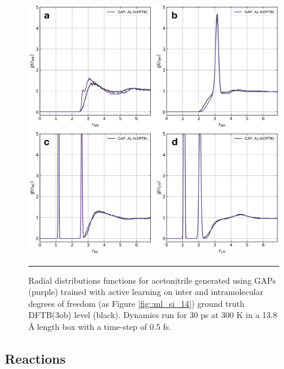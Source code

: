 \documentclass[../../main.tex]{subfiles}
\begin{document}
\begin{figure}[h!]
	\vspace{0.4cm}
	\centering
    \includegraphics[width=14cm]{6/gap/figs_si/fig15}
	\vspace{0.2cm}
	\hrule
	\caption{Radial distributions functions for acetonitrile generated using GAPs (purple) trained with active learning on inter and intramolecular degrees of freedom (as Figure \ref{fig::ml_si_14}) ground truth DFTB(3ob) level (black). Dynamics run for 30 ps at 300 K in a 13.8 \AA$\;$length box with a time-step of 0.5 fs.}
	\label{fig::ml_si_15}
\end{figure}

\clearpage 
\subsection{Reactions}
\end{document}
